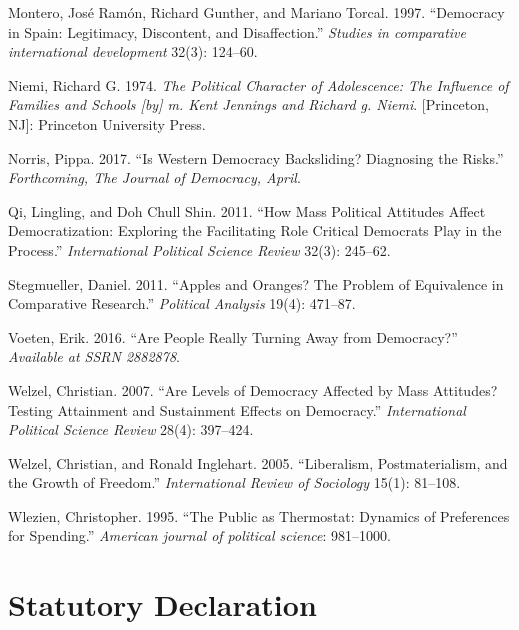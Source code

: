 \documentclass[12pt,english,a4paper,oneside]{article}
\newlength{\cslhangindent}
\newlength{\cslentryspacingunit} %
\newenvironment{CSLReferences}[2] %
 {%
  \setlength{\parindent}{0pt}
  \ifodd #1
  \let\oldpar\par
  \def\par{\hangindent=\cslhangindent\oldpar}
  \fi
  \setlength{\parskip}{#2\cslentryspacingunit}
 }%
 {}
\theoremstyle{definition}
\theoremstyle{definition}
\theoremstyle{definition}
\theoremstyle{definition}
\theoremstyle{remark}
\begin{document}
\begin{CSLReferences}{1}{0}
\leavevmode{}%
Montero, José Ramón, Richard Gunther, and Mariano Torcal. 1997. {``Democracy in Spain: Legitimacy, Discontent, and Disaffection.''} \emph{Studies in comparative international development} 32(3): 124--60.

\leavevmode{}%
Niemi, Richard G. 1974. \emph{The Political Character of Adolescence: The Influence of Families and Schools {[}by{]} m. Kent Jennings and Richard g. Niemi}. {[}Princeton, NJ{]}: Princeton University Press.

\leavevmode{}%
Norris, Pippa. 2017. {``Is Western Democracy Backsliding? Diagnosing the Risks.''} \emph{Forthcoming, The Journal of Democracy, April}.

\leavevmode{}%
Qi, Lingling, and Doh Chull Shin. 2011. {``How Mass Political Attitudes Affect Democratization: Exploring the Facilitating Role Critical Democrats Play in the Process.''} \emph{International Political Science Review} 32(3): 245--62.

\leavevmode{}%
Stegmueller, Daniel. 2011. {``Apples and Oranges? The Problem of Equivalence in Comparative Research.''} \emph{Political Analysis} 19(4): 471--87.

\leavevmode{}%
Voeten, Erik. 2016. {``Are People Really Turning Away from Democracy?''} \emph{Available at SSRN 2882878}.

\leavevmode{}%
Welzel, Christian. 2007. {``Are Levels of Democracy Affected by Mass Attitudes? Testing Attainment and Sustainment Effects on Democracy.''} \emph{International Political Science Review} 28(4): 397--424.

\leavevmode{}%
Welzel, Christian, and Ronald Inglehart. 2005. {``Liberalism, Postmaterialism, and the Growth of Freedom.''} \emph{International Review of Sociology} 15(1): 81--108.

\leavevmode{}%
Wlezien, Christopher. 1995. {``The Public as Thermostat: Dynamics of Preferences for Spending.''} \emph{American journal of political science}: 981--1000.

\end{CSLReferences}

\clearpage

\hypertarget{statutory-declaration}{%
\section*{Statutory Declaration}\label{statutory-declaration}}
\end{document}

